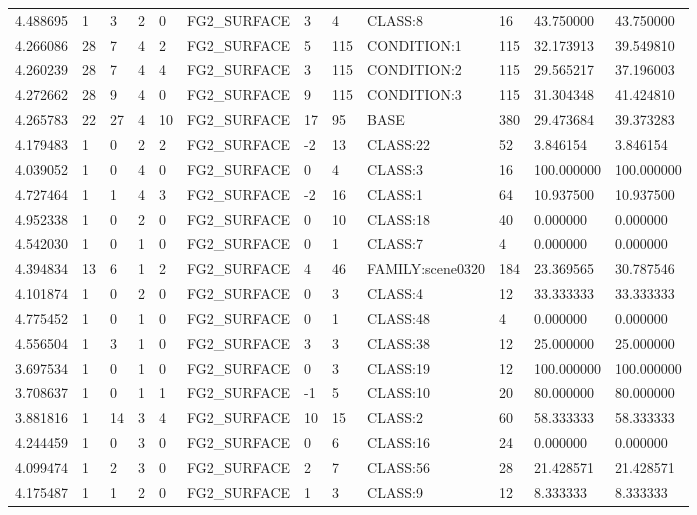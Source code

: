 \begin{tabular}{llllllllllll}
4.488695 & 1 & 3 & 2 & 0 & FG2\_SURFACE & 3 & 4 & CLASS:8 & 16 & 43.750000 & 43.750000 \\
4.266086 & 28 & 7 & 4 & 2 & FG2\_SURFACE & 5 & 115 & CONDITION:1 & 115 & 32.173913 & 39.549810 \\
4.260239 & 28 & 7 & 4 & 4 & FG2\_SURFACE & 3 & 115 & CONDITION:2 & 115 & 29.565217 & 37.196003 \\
4.272662 & 28 & 9 & 4 & 0 & FG2\_SURFACE & 9 & 115 & CONDITION:3 & 115 & 31.304348 & 41.424810 \\
4.265783 & 22 & 27 & 4 & 10 & FG2\_SURFACE & 17 & 95 & BASE & 380 & 29.473684 & 39.373283 \\
4.179483 & 1 & 0 & 2 & 2 & FG2\_SURFACE & -2 & 13 & CLASS:22 & 52 & 3.846154 & 3.846154 \\
4.039052 & 1 & 0 & 4 & 0 & FG2\_SURFACE & 0 & 4 & CLASS:3 & 16 & 100.000000 & 100.000000 \\
4.727464 & 1 & 1 & 4 & 3 & FG2\_SURFACE & -2 & 16 & CLASS:1 & 64 & 10.937500 & 10.937500 \\
4.952338 & 1 & 0 & 2 & 0 & FG2\_SURFACE & 0 & 10 & CLASS:18 & 40 & 0.000000 & 0.000000 \\
4.542030 & 1 & 0 & 1 & 0 & FG2\_SURFACE & 0 & 1 & CLASS:7 & 4 & 0.000000 & 0.000000 \\
4.394834 & 13 & 6 & 1 & 2 & FG2\_SURFACE & 4 & 46 & FAMILY:scene0320 & 184 & 23.369565 & 30.787546 \\
4.101874 & 1 & 0 & 2 & 0 & FG2\_SURFACE & 0 & 3 & CLASS:4 & 12 & 33.333333 & 33.333333 \\
4.775452 & 1 & 0 & 1 & 0 & FG2\_SURFACE & 0 & 1 & CLASS:48 & 4 & 0.000000 & 0.000000 \\
4.556504 & 1 & 3 & 1 & 0 & FG2\_SURFACE & 3 & 3 & CLASS:38 & 12 & 25.000000 & 25.000000 \\
3.697534 & 1 & 0 & 1 & 0 & FG2\_SURFACE & 0 & 3 & CLASS:19 & 12 & 100.000000 & 100.000000 \\
3.708637 & 1 & 0 & 1 & 1 & FG2\_SURFACE & -1 & 5 & CLASS:10 & 20 & 80.000000 & 80.000000 \\
3.881816 & 1 & 14 & 3 & 4 & FG2\_SURFACE & 10 & 15 & CLASS:2 & 60 & 58.333333 & 58.333333 \\
4.244459 & 1 & 0 & 3 & 0 & FG2\_SURFACE & 0 & 6 & CLASS:16 & 24 & 0.000000 & 0.000000 \\
4.099474 & 1 & 2 & 3 & 0 & FG2\_SURFACE & 2 & 7 & CLASS:56 & 28 & 21.428571 & 21.428571 \\
4.175487 & 1 & 1 & 2 & 0 & FG2\_SURFACE & 1 & 3 & CLASS:9 & 12 & 8.333333 & 8.333333 \\

\end{tabular}
